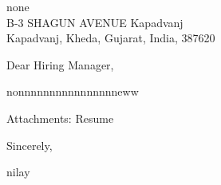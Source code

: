 \documentclass[11pt,a4paper]{letter}
\begin{document}
\begin{letter}{
none\\
B-3 SHAGUN AVENUE Kapadvanj\\
Kapadvanj, Kheda, Gujarat, India, 387620
}

\address{
nilay\\
B-3 SHAGUN AVENUE Kapadvanj\\
Kapadvanj, Kheda, Gujarat, India, 387620\\
9016989674\\
\href{mailto:nilaypatel@gmail.com}{nilaypatel@gmail.com}
}

\date{12/11/2024}

\opening{Dear Hiring Manager,}

nonnnnnnnnnnnnnnnneww

\vspace{\baselineskip}
\noindent Attachments: Resume

\closing{Sincerely,}nilay

\end{letter}
\end{document}
